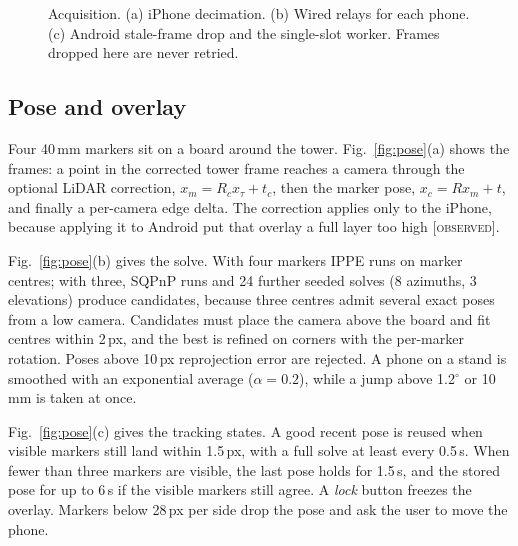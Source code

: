 \documentclass[conference,10pt]{IEEEtran}
\newcommand{\code}[1]{\texttt{\small\detokenize{#1}}}
\newcommand{\evO}{\textsc{[observed]}}
\begin{document}
\begin{figure}[!t]
\caption{Acquisition. (a) iPhone decimation. (b) Wired relays for each phone. (c) Android stale-frame drop and the single-slot worker. Frames dropped here are never retried.}\label{fig:acq}
\end{figure}

\subsection{Pose and overlay}\label{sec:pose}
Four 40\,mm \code{DICT_4X4_50} markers sit on a board around the tower. Fig.~\ref{fig:pose}(a) shows the frames: a point in the corrected tower frame reaches a camera through the optional LiDAR correction, $x_m=R_cx_\tau+t_c$, then the marker pose, $x_c=Rx_m+t$, and finally a per-camera edge delta. The correction applies only to the iPhone, because applying it to Android put that overlay a full layer too high \evO.

Fig.~\ref{fig:pose}(b) gives the solve. With four markers IPPE runs on marker centres; with three, SQPnP runs and 24 further seeded solves (8 azimuths, 3 elevations) produce candidates, because three centres admit several exact poses from a low camera. Candidates must place the camera above the board and fit centres within 2\,px, and the best is refined on corners with the per-marker rotation. Poses above 10\,px reprojection error are rejected. A phone on a stand is smoothed with an exponential average ($\alpha=0.2$), while a jump above 1.2$^\circ$ or 10\,mm is taken at once.

Fig.~\ref{fig:pose}(c) gives the tracking states. A good recent pose is reused when visible markers still land within 1.5\,px, with a full solve at least every 0.5\,s. When fewer than three markers are visible, the last pose holds for 1.5\,s, and the stored pose for up to 6\,s if the visible markers still agree. A \emph{lock} button freezes the overlay. Markers below 28\,px per side drop the pose and ask the user to move the phone.
\end{document}
